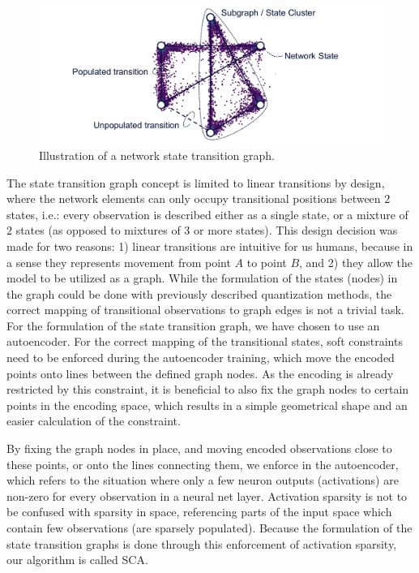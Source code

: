 			\begin{figure}[ht]
				\centering
				\includegraphics[width=\linewidth]{figures/06_sparse_clust/stategraph_transitions/stategraph_transitions.pdf}
				\caption[Network state transition graph illustration]{Illustration of a network state transition graph.}
				\label{fig:stategraph_transitions}
			\end{figure}
			
			The state transition graph concept is limited to linear transitions by design, where the network elements can only occupy transitional positions between $2$ states, i.e.: every observation is described either as a single state, or a mixture of $2$ states (as opposed to mixtures of $3$ or more states).
			This design decision was made for two reasons: 1) linear transitions are intuitive for us humans, because in a sense they represents movement from point $A$ to point $B$, and 2) they allow the model to be utilized as a graph.
			While the formulation of the states (nodes) in the graph could be done with previously described quantization methods, the correct mapping of transitional observations to graph edges is not a trivial task.
			For the formulation of the state transition graph, we have chosen to use an autoencoder.			
			For the correct mapping of the transitional states, soft constraints need to be enforced during the autoencoder training, which move the encoded points onto lines between the defined graph nodes.
			As the encoding is already restricted by this constraint, it is beneficial to also fix the graph nodes to certain points in the encoding space, which results in a simple geometrical shape and an easier calculation of the constraint.
			
			By fixing the graph nodes in place, and moving encoded observations close to these points, or onto the lines connecting them, we enforce  in the autoencoder, which refers to the situation where only a few neuron outputs (activations) are non-zero for every observation in a neural net layer.
			Activation sparsity is not to be confused with sparsity in space, referencing parts of the input space which contain few observations (are sparsely populated).
			Because the formulation of the state transition graphs is done through this enforcement of activation sparsity, our algorithm is called \ac{SCA}.

